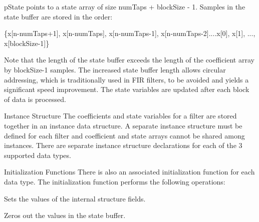 \begin{DoxyParagraph}{}
{\ttfamily p\-State} points to a state array of size {\ttfamily num\-Taps + block\-Size -\/ 1}. Samples in the state buffer are stored in the order\-: 
\end{DoxyParagraph}
\begin{DoxyParagraph}{}

\begin{DoxyPre}   
    \{x[n-numTaps+1], x[n-numTaps], x[n-numTaps-1], x[n-numTaps-2]....x[0], x[1], ..., x[blockSize-1]\}   
 \end{DoxyPre}
 
\end{DoxyParagraph}
\begin{DoxyParagraph}{}
Note that the length of the state buffer exceeds the length of the coefficient array by {\ttfamily block\-Size-\/1} samples. The increased state buffer length allows circular addressing, which is traditionally used in F\-I\-R filters, to be avoided and yields a significant speed improvement. The state variables are updated after each block of data is processed. 
\end{DoxyParagraph}
\begin{DoxyParagraph}{Instance Structure }
The coefficients and state variables for a filter are stored together in an instance data structure. A separate instance structure must be defined for each filter and coefficient and state arrays cannot be shared among instances. There are separate instance structure declarations for each of the 3 supported data types.
\end{DoxyParagraph}
\begin{DoxyParagraph}{Initialization Functions }
There is also an associated initialization function for each data type. The initialization function performs the following operations\-:
\begin{DoxyItemize}
\item Sets the values of the internal structure fields.
\item Zeros out the values in the state buffer. 
\end{DoxyItemize}
\end{DoxyParagraph}
